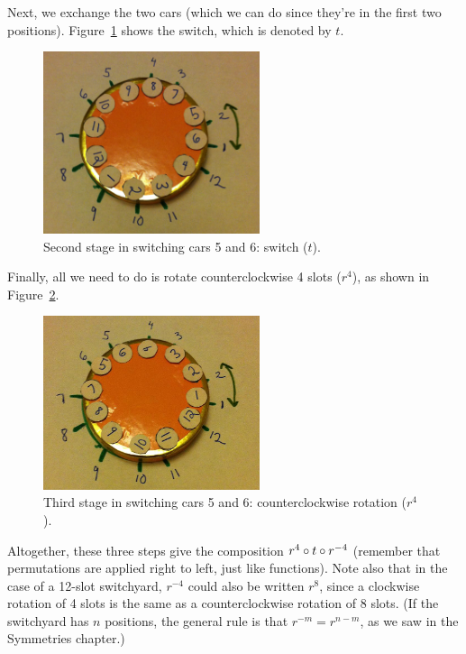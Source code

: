 Next, we exchange the two cars (which we can do since they're in the first two positions). Figure~\ref{fig:switchyard_t} shows the switch, which is denoted by $t$.
\begin{figure}[ht]
\begin{center}
\includegraphics[width=2.5in]{images/switchyard_t.jpg}
\caption{Second stage in switching cars 5 and 6: switch ($t$).}\label{fig:switchyard_t}
\end{center}
\end{figure} 

Finally, all we need to do is rotate counterclockwise 4 slots ($r^4$), as shown in Figure~\ref{fig:switchyardCCL4}.
\begin{figure}[ht]
\begin{center}
\includegraphics[width=2.5in]{images/switchyardCCL4.jpg}
\caption{Third stage in switching cars 5 and 6: counterclockwise rotation ($r^{4}$).}\label{fig:switchyardCCL4}
\end{center}
\end{figure} 

Altogether, these three steps give the composition $r^4 \circ t \circ r^{-4}$ (remember that permutations are applied right to left, just like functions).  Note also that in the case of a 12-slot switchyard, $r^{-4}$ could also be written $r^8$, since a clockwise rotation of 4 slots is the same as a counterclockwise rotation of 8 slots.  (If the switchyard has $n$ positions, the general rule is that $r^{-m} = r^{n-m}$, as we saw in the Symmetries chapter.)

